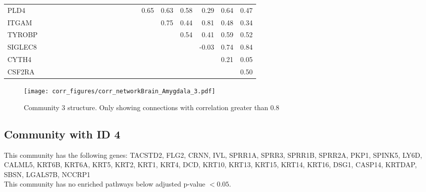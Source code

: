 \begin{longtable}{lrrrrrrrrrrrrrrrrrrrr}
PLD4    &            &              &              &              &             &            &              &              &           &             &               &               &              &            &        0.65 &         0.63 &          0.58 &        0.29 &         0.64 &        0.47 \\
ITGAM   &            &              &              &              &             &            &              &              &           &             &               &               &              &            &             &         0.75 &          0.44 &        0.81 &         0.48 &        0.34 \\
TYROBP  &            &              &              &              &             &            &              &              &           &             &               &               &              &            &             &              &          0.54 &        0.41 &         0.59 &        0.52 \\
SIGLEC8 &            &              &              &              &             &            &              &              &           &             &               &               &              &            &             &              &               &       -0.03 &         0.74 &        0.84 \\
CYTH4   &            &              &              &              &             &            &              &              &           &             &               &               &              &            &             &              &               &             &         0.21 &        0.05 \\
CSF2RA  &            &              &              &              &             &            &              &              &           &             &               &               &              &            &             &              &               &             &              &        0.50 \\
\end{longtable}


\begin{figure}[h!]
\centering
\texttt{[image: corr\_figures/corr\_networkBrain\_Amygdala\_3.pdf]}
\caption{Community 3 structure. Only showing connections with correlation greater than 0.8}
\end{figure}




\subsection*{Community with ID 4}
This community has the following genes: TACSTD2, FLG2, CRNN, IVL, SPRR1A, SPRR3, SPRR1B, SPRR2A, PKP1, SPINK5, LY6D, CALML5, KRT6B, KRT6A, KRT5, KRT2, KRT1, KRT4, DCD, KRT10, KRT13, KRT15, KRT14, KRT16, DSG1, CASP14, KRTDAP, SBSN, LGALS7B, NCCRP1
\\
This community has no enriched pathways below adjusted p-value $< 0.05$.

